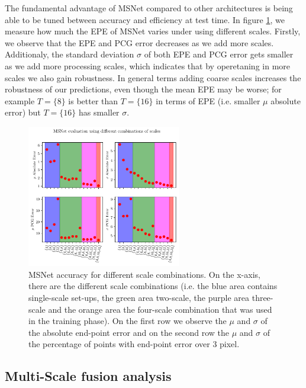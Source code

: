 \documentclass[runningheads]{llncs}
\begin{document}
The fundamental advantage of MSNet compared to other architectures is being able to be tuned between accuracy and efficiency at test time. In figure \ref{fig:msnet_scales_evaluation}, we measure how much the EPE of MSNet varies under using different scales. Firstly, we observe that the EPE and PCG error decreases as we add more scales. Additionaly, the standard deviation $\sigma$ of both EPE and PCG error gets smaller as we add more processing scales, which indicates that by operetaning in more scales we also gain robustness. In general terms adding coarse scales increases the robustness of our predictions, even though the mean EPE may be worse; for example $T=\{ 8 \}$ is better than $ T = \{ 16 \}$ in terms of EPE (i.e. smaller $\mu$ absolute error) but $ T = \{ 16 \}$ has smaller $\sigma$. 

\begin{figure}[htbp!]
    \centering
    \includegraphics[width=0.6\textwidth]{figures/msnet_scales_evaluation.pdf}
    \caption{MSNet accuracy for different scale combinations. On the x-axis, there are the different scale combinations (i.e. the blue area contains single-scale set-ups, the green area two-scale, the purple area three-scale and the orange area the four-scale combination that was used in the training phase). On the first row we observe the $\mu$ and $\sigma$ of the absolute end-point error and on the second row the $\mu$ and $\sigma$ of the percentage of points with end-point error over 3 pixel.}
    \label{fig:msnet_scales_evaluation}
\end{figure}

\subsection{Multi-Scale fusion analysis} \label{sec:4_1}
\end{document}
